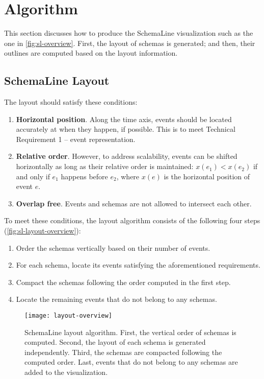 \section{Algorithm}
\label{sec:sl-algorithm}
This section discusses how to produce the SchemaLine visualization such as the one in \autoref{fig:sl-overview}. First, the layout of schemas is generated; and then, their outlines are computed based on the layout information.

\subsection{SchemaLine Layout}
The layout should satisfy these conditions: 
\begin{enumerate}
	\item \textbf{Horizontal position}. Along the time axis, events should be located accurately at when they happen, if possible. This is to meet Technical Requirement 1 -- event representation.
	\item \textbf{Relative order}. However, to address scalability, events can be shifted horizontally as long as their relative order is maintained: $x(e_1) < x(e_2)$ if and only if $e_1$ happens before $e_2$, where $x(e)$ is the horizontal position of event $e$.
	\item \textbf{Overlap free}. Events and schemas are not allowed to intersect each other.
\end{enumerate}

To meet these conditions, the layout algorithm consists of the following four steps (\autoref{fig:sl-layout-overview}):
\begin{enumerate} 
	\item Order the schemas vertically based on their number of events.
	\item For each schema, locate its events satisfying the aforementioned requirements.
	\item Compact the schemas following the order computed in the first step.
	\item Locate the remaining events that do not belong to any schemas. 
\end{enumerate}

\begin{figure}[!htb]
\centering
\texttt{[image: layout-overview]}
\caption{SchemaLine layout algorithm. First, the vertical order of schemas is computed. Second, the layout of each schema is generated independently. Third, the schemas are compacted following the computed order. Last, events that do not belong to any schemas are added to the visualization.}
\label{fig:sl-layout-overview}
\end{figure}

